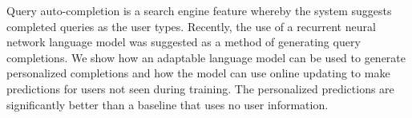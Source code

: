 Query auto-completion is a search engine feature whereby the system suggests completed queries as the user types. Recently, the use of a recurrent neural network language model was suggested as a method of generating query completions. We show how an adaptable language model can be used to generate personalized completions and how the model can use online updating to make predictions for users not seen during training. The personalized predictions are significantly better than a baseline that uses no user information.
